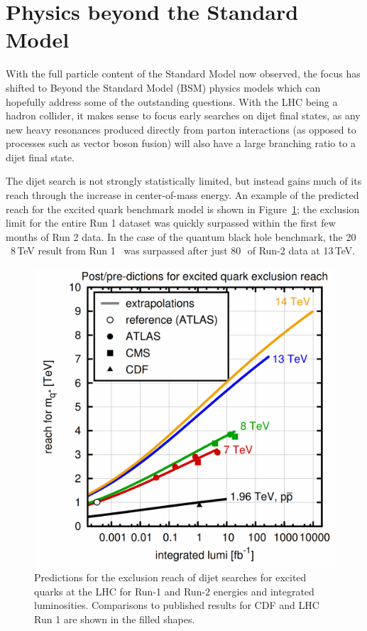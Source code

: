 \section{Physics beyond the Standard Model}

With the full particle content of the Standard Model now observed, the focus has shifted to Beyond the Standard Model (BSM) physics models which can hopefully address some of the outstanding questions.  With the LHC being a hadron collider, it makes sense to focus early searches on dijet final states, as any new heavy resonances produced directly from parton interactions (as opposed to processes such as vector boson fusion) will also have a large branching ratio to a dijet final state.

The dijet search is not strongly statistically limited, but instead gains much of its reach through the increase in center-of-mass energy.  An example of the predicted reach for the excited quark benchmark model is shown in Figure~\ref{fig:QStarReach}; the exclusion limit for the entire Run 1 dataset was quickly surpassed within the first few months of Run 2 data.  In the case of the quantum black hole benchmark, the 20\,\ifb~8\,TeV result from Run 1~\cite{DijetResonance8TeV_ATLAS} was surpassed after just 80\,\ipb~of Run-2 data at 13\,TeV.\cite{Dijet13TeV_80pb}

\begin{figure}[h!]
	\centering
	\includegraphics[width=0.7\columnwidth]{figures/Conclusion/QStarReach.png}
	\caption{Predictions for the exclusion reach of dijet searches for excited quarks at the LHC for Run-1 and Run-2 energies and integrated luminosities.\cite{QStarReachSource}  Comparisons to published results for CDF and LHC Run 1 are shown in the filled shapes.}
	\label{fig:QStarReach}
\end{figure}

